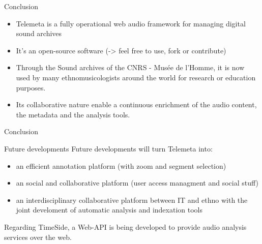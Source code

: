 \documentclass[final, hyperref, table]{beamer}
\begin{document}
\begin{frame}{Conclusion}
  \begin{block}{}
    \begin{itemize}[<+->]
    \item Telemeta is a \alert{fully operational} web audio framework
      for managing digital sound archives
    \item It's an \alert{open-source} software (-> feel free to use,
      fork or contribute)
    \item Through the Sound archives of the CNRS - Musée de l’Homme,
      it is now used by many ethnomusicologists around the world for
      research or education purposes.
    \item Its collaborative nature enable a \alert{continuous
        enrichment} of the audio content, the metadata and the
      analysis tools.
    \end{itemize}
  \end{block}
\end{frame}
\begin{frame}{Conclusion}
  \begin{block}{Future developments}
Future developments will turn Telemeta into:
    \begin{itemize}
    \item an efficient \alert{annotation platform} (with zoom and segment selection)
    \item an \alert{social and collaborative platform} (user access managment and social stuff)
    \item an \alert{interdisciplinary} collaborative platform between IT and ethno with the joint develoment of automatic analysis and indexation tools
    \end{itemize}

Regarding TimeSide, a Web-API is being developed to provide audio analysis services over the web. 
  \end{block}
\end{frame}
\end{document}
